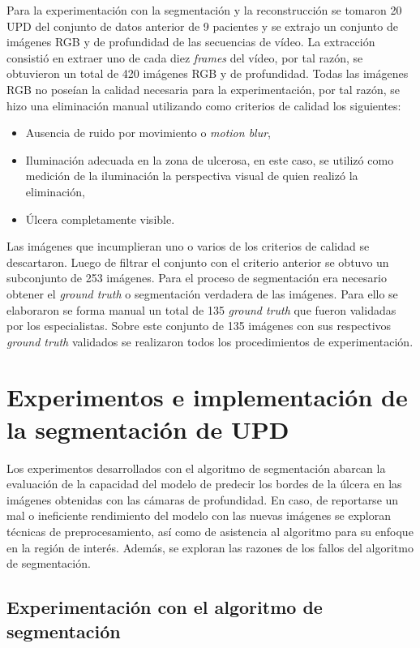 Para la experimentación con la segmentación y la reconstrucción se tomaron 20 UPD del conjunto de datos anterior de 9 pacientes y se extrajo un conjunto de imágenes RGB y de profundidad de las secuencias de vídeo. La extracción consistió en extraer uno de cada diez \textit{frames} del vídeo, por tal razón, se obtuvieron un total de 420 imágenes RGB y de profundidad. Todas las imágenes RGB no poseían la calidad necesaria para la experimentación, por tal razón, se hizo una eliminación manual utilizando como criterios de calidad los siguientes:
\begin{itemize}
	\item Ausencia de ruido por movimiento o \textit{motion blur},
	\item Iluminación adecuada en la zona de ulcerosa, en este caso, se utilizó como medición de la iluminación la perspectiva visual de quien realizó la eliminación, 
	\item Úlcera completamente visible. 
\end{itemize}
Las imágenes que incumplieran uno o varios de los criterios de calidad se descartaron. Luego de filtrar el conjunto con el criterio anterior se obtuvo un subconjunto de 253 imágenes. Para el proceso de segmentación era necesario obtener el \textit{ground truth} o segmentación verdadera de las imágenes. Para ello se elaboraron se forma manual un total de 135 \textit{ground truth} que fueron validadas por los especialistas. Sobre este conjunto de 135 imágenes con sus respectivos \textit{ground truth} validados se realizaron todos los procedimientos de experimentación.

\section{Experimentos e implementación de la segmentación de UPD}

Los experimentos desarrollados con el algoritmo de segmentación abarcan la evaluación de la capacidad del modelo de predecir los bordes de la úlcera en las imágenes obtenidas con las cámaras de profundidad. En caso, de reportarse un mal o ineficiente rendimiento del modelo con las nuevas imágenes se exploran técnicas de preprocesamiento, así como de asistencia al algoritmo para su enfoque en la región de interés. Además, se exploran las razones de los fallos del algoritmo de segmentación. 

\subsection{Experimentación con el algoritmo de segmentación}

